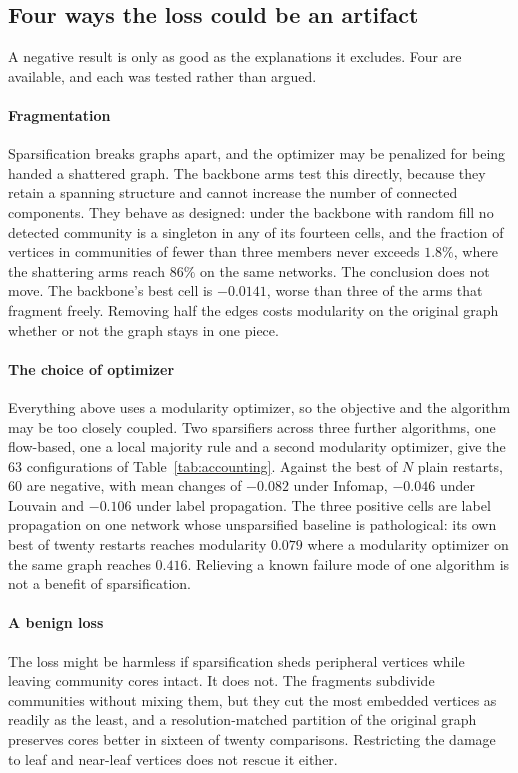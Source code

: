 \subsection{Four ways the loss could be an artifact}\label{sec:negative:artifact}

A negative result is only as good as the explanations it excludes. Four are
available, and each was tested rather than argued.

\paragraph{Fragmentation}
Sparsification breaks graphs apart, and the optimizer may be penalized for being
handed a shattered graph. The backbone arms test this directly, because they
retain a spanning structure and cannot increase the number of connected
components. They behave as designed: under the backbone with random fill no
detected community is a singleton in any of its fourteen cells, and the fraction
of vertices in communities of fewer than three members never exceeds $1.8\%$,
where the shattering arms reach $86\%$ on the same networks. The conclusion does
not move. The backbone's best cell is $-0.0141$, worse than three of the arms that
fragment freely. Removing half the edges costs modularity on the original graph
whether or not the graph stays in one piece.

\paragraph{The choice of optimizer}
Everything above uses a modularity optimizer, so the objective and the algorithm
may be too closely coupled. Two sparsifiers across three further algorithms, one
flow-based, one a local majority rule and a second modularity optimizer, give the
63 configurations of Table~\ref{tab:accounting}. Against the best of $N$ plain
restarts, 60 are negative, with mean changes of $-0.082$ under Infomap, $-0.046$
under Louvain and $-0.106$ under label propagation. The three positive cells are
label propagation on one network whose unsparsified baseline is pathological: its
own best of twenty restarts reaches modularity $0.079$ where a modularity
optimizer on the same graph reaches $0.416$. Relieving a known failure mode of one
algorithm is not a benefit of sparsification.

\paragraph{A benign loss}
The loss might be harmless if sparsification sheds peripheral vertices while
leaving community cores intact. It does not. The fragments subdivide communities
without mixing them, but they cut the most embedded vertices as readily as the
least, and a resolution-matched partition of the original graph preserves cores
better in sixteen of twenty comparisons. Restricting the damage to leaf and
near-leaf vertices does not rescue it either.

